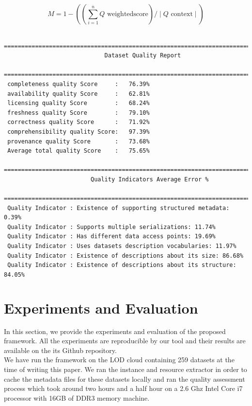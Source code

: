 \documentclass[onecolumn, crcready]{iosart2c}
\begin{document}
\begin{equation}
 M =  1 - ((\sum_{i=1}^{n} Q\textrm{ weightedscore}) / \mid Q\textrm{ context} \mid )
\end{equation}

\begin{lstlisting}
 =================================================================================
                             Dataset Quality Report
 =================================================================================
 completeness quality Score     :   76.39%
 availability quality Score     :   62.81%
 licensing quality Score        :   68.24%
 freshness quality Score        :   79.10%
 correctness quality Score      :   71.92%
 comprehensibility quality Score:   97.39%
 provenance quality Score       :   73.68%
 Average total quality Score    :   75.65%
 =================================================================================
                         Quality Indicators Average Error %
 =================================================================================
 Quality Indicator : Existence of supporting structured metadata: 0.39%
 Quality Indicator : Supports multiple serializations: 11.74%
 Quality Indicator : Has different data access points: 19.69%
 Quality Indicator : Uses datasets description vocabularies: 11.97%
 Quality Indicator : Existence of descriptions about its size: 86.68%
 Quality Indicator : Existence of descriptions about its structure: 84.05%
\end{lstlisting}

\section{Experiments and Evaluation}

In this section, we provide the experiments and evaluation of the proposed framework. All the experiments are reproducible by our tool and their results are available on the its Github repository.\\
We have run the framework on the LOD cloud containing 259 datasets at the time of writing this paper. We ran the instance and resource extractor in order to cache the metadata files for these datasets locally and ran the quality assessment process which took around two hours and a half hour on a 2.6 Ghz Intel Core i7 processor with 16GB of DDR3 memory machine.\\
\end{document}
